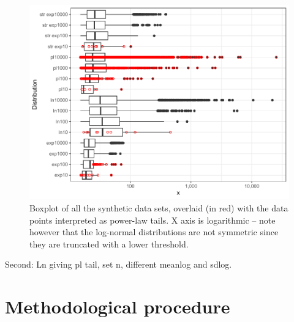 \documentclass[
  12pt,
]{book}
\begin{document}
\begin{figure}

{\centering \includegraphics[width=0.7\linewidth]{bookdown-demo_files/figure-latex/05-pltails-1} 

}

\caption{Boxplot of all the synthetic data sets, overlaid (in red) with the data points interpreted as power-law tails. X axis is logarithmic -- note however that the log-normal distributions are not symmetric since they are truncated with a lower threshold.}\label{fig:05-pltails}
\end{figure}

\FloatBarrier

Second: Ln giving pl tail, set n, different meanlog and sdlog.

\hypertarget{methodological-procedure}{%
\section{Methodological procedure}\label{methodological-procedure}}
\end{document}
